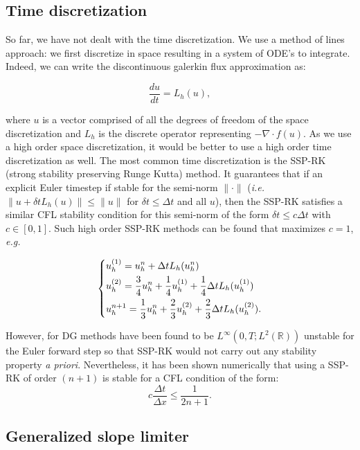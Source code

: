 \documentclass[10pt]{article}
\begin{document}
\subsection{Time discretization}
So far, we have not dealt with the time discretization. We use a method of lines approach: we first discretize in space resulting in a system of ODE's to integrate. Indeed, we can write the discontinuous galerkin flux approximation as:

\[\frac{du}{dt} = L_h(u),\]

where \(u\) is a vector comprised of all the degrees of freedom of the space discretization and \(L_h\) is the discrete operator representing \(-\nabla\cdot f(u)\). As we use a high order space discretization, it would be better to use a high order time discretization as well. The most common time discretization is the SSP-RK (strong stability preserving Runge Kutta) method. It guarantees that if an explicit Euler timestep if stable for the semi-norm \(\|\cdot\|\) (\emph{i.e.} \(\|u+\delta tL_h(u)\| \leq \|u\|\) for \(\delta t \leq \Delta t\) and all \(u\)), then the SSP-RK satisfies a similar CFL stability condition for this semi-norm of the form \(\delta t \leq c\Delta t\) with \(c\in [0,1]\). Such high order SSP-RK methods can be found that maximizes \(c=1\), \emph{e.g.}

\begin{align*}
  \begin{dcases}
    u_h^{(1)} = u_h^n + \Delta t L_h(u_h^n) \\
    u_h^{(2)} = \frac34 u_h^n + \frac14 u_h^{(1)} + \frac14\Delta tL_h(u_h^{(1)}) \\
    u_h^{n+1} = \frac13 u_h^n + \frac23 u_h^{(2)} + \frac23 \Delta tL_h(u_h^{(2)}).
  \end{dcases}
\end{align*}

However, for DG methods have been found to be \(L^\infty(0,T;L^2(\mathbb{R}))\) unstable \cite{Cockburn1998} for the Euler forward step so that SSP-RK would not carry out any stability property \emph{a priori}. Nevertheless, it has been shown numerically that using a SSP-RK of order \((n+1)\) is stable for a CFL condition of the form:
\[c\frac{\Delta t}{\Delta x} \leq \frac1{2n+1}.\]

\subsection{Generalized slope limiter}
\end{document}
